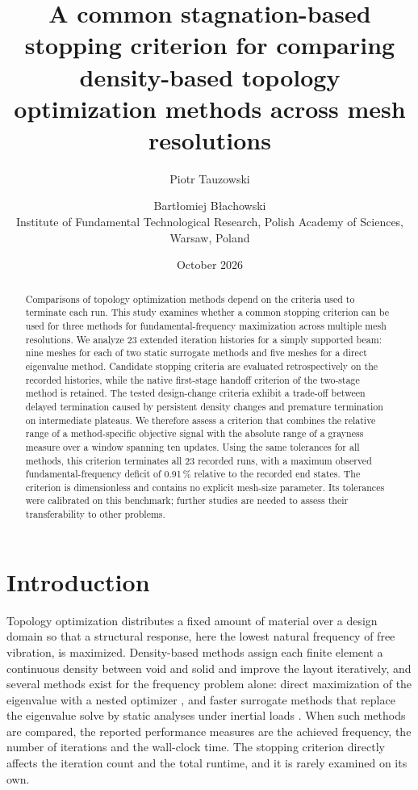 \documentclass[11pt,a4paper]{article}
\title{A common stagnation-based stopping criterion for comparing density-based topology optimization methods across mesh resolutions}
\author{Piotr Tauzowski \and Bartłomiej Błachowski\\[0.3em]
  \small Institute of Fundamental Technological Research, Polish Academy of Sciences, Warsaw, Poland}
\date{October 2026}
\begin{document}
\maketitle

\begin{abstract}
Comparisons of topology optimization methods depend on the criteria used to terminate each run. This study examines whether a common stopping criterion can be used for three methods for fundamental-frequency maximization across multiple mesh resolutions. We analyze 23 extended iteration histories for a simply supported beam: nine meshes for each of two static surrogate methods and five meshes for a direct eigenvalue method. Candidate stopping criteria are evaluated retrospectively on the recorded histories, while the native first-stage handoff criterion of the two-stage method is retained. The tested design-change criteria exhibit a trade-off between delayed termination caused by persistent density changes and premature termination on intermediate plateaus. We therefore assess a criterion that combines the relative range of a method-specific objective signal with the absolute range of a grayness measure over a window spanning ten updates. Using the same tolerances for all methods, this criterion terminates all 23 recorded runs, with a maximum observed fundamental-frequency deficit of 0.91\,\% relative to the recorded end states. The criterion is dimensionless and contains no explicit mesh-size parameter. Its tolerances were calibrated on this benchmark; further studies are needed to assess their transferability to other problems.
\end{abstract}

\section{Introduction}
\label{sec:intro}

Topology optimization distributes a fixed amount of material over a design domain so that a structural response, here the lowest natural frequency of free vibration, is maximized. Density-based methods assign each finite element a continuous density between void and solid and improve the layout iteratively, and several methods exist for the frequency problem alone: direct maximization of the eigenvalue with a nested optimizer \citep{Du2007,Olhoff2014}, and faster surrogate methods that replace the eigenvalue solve by static analyses under inertial loads \citep{Yuksel2025,Tauzowski2026}. When such methods are compared, the reported performance measures are the achieved frequency, the number of iterations and the wall-clock time. The stopping criterion directly affects the iteration count and the total runtime, and it is rarely examined on its own.
\end{document}

